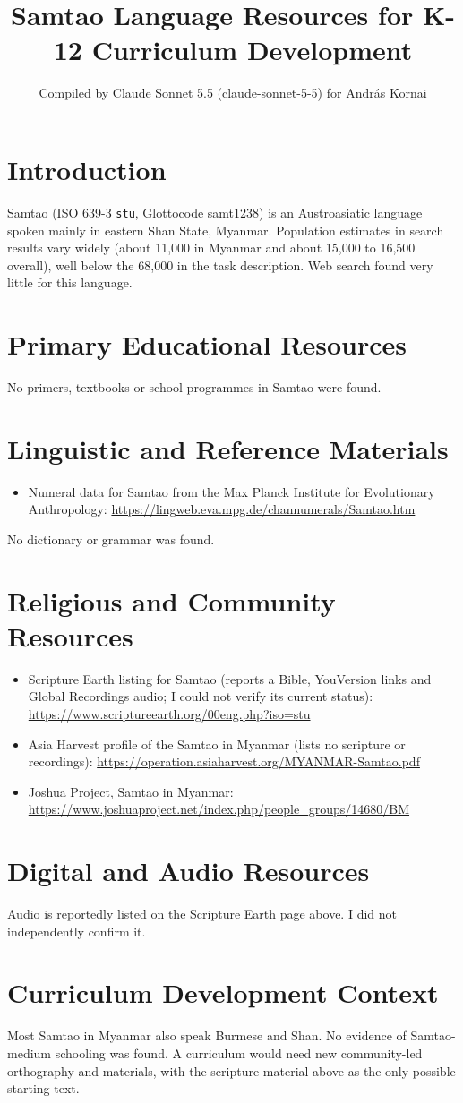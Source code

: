 \documentclass[12pt]{article}
\title{Samtao Language Resources for K-12 Curriculum Development}
\author{Compiled by Claude Sonnet 5.5 (claude-sonnet-5-5) for Andr\'as Kornai}
\date{}
\begin{document}
\maketitle

\section{Introduction}
Samtao (ISO 639-3 \texttt{stu}, Glottocode samt1238) is an Austroasiatic language spoken mainly in eastern Shan State, Myanmar. Population estimates in search results vary widely (about 11,000 in Myanmar and about 15,000 to 16,500 overall), well below the 68,000 in the task description. Web search found very little for this language.

\section{Primary Educational Resources}
No primers, textbooks or school programmes in Samtao were found.

\section{Linguistic and Reference Materials}
\begin{itemize}
\item Numeral data for Samtao from the Max Planck Institute for Evolutionary Anthropology: \url{https://lingweb.eva.mpg.de/channumerals/Samtao.htm}
\end{itemize}
No dictionary or grammar was found.

\section{Religious and Community Resources}
\begin{itemize}
\item Scripture Earth listing for Samtao (reports a Bible, YouVersion links and Global Recordings audio; I could not verify its current status): \url{https://www.scriptureearth.org/00eng.php?iso=stu}
\item Asia Harvest profile of the Samtao in Myanmar (lists no scripture or recordings): \url{https://operation.asiaharvest.org/MYANMAR-Samtao.pdf}
\item Joshua Project, Samtao in Myanmar: \url{https://www.joshuaproject.net/index.php/people_groups/14680/BM}
\end{itemize}

\section{Digital and Audio Resources}
Audio is reportedly listed on the Scripture Earth page above. I did not independently confirm it.

\section{Curriculum Development Context}
Most Samtao in Myanmar also speak Burmese and Shan. No evidence of Samtao-medium schooling was found. A curriculum would need new community-led orthography and materials, with the scripture material above as the only possible starting text.
\end{document}
